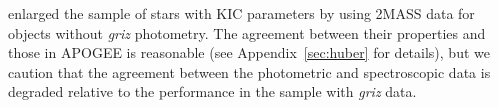 \documentclass[preprint2]{aastex62}
\newcommand{\vsini}{\ensuremath{v \sin i}}
\newcommand{\Kepler}{\mbox{\textit{Kepler}}}
\newcommand{\Gaia}{\mbox{\textit{Gaia}}}
\begin{document}
%

\citet{Huber14} enlarged the sample of stars with KIC parameters by using 2MASS
data for objects without \textit{griz} photometry. The agreement between their
properties and those in APOGEE is reasonable (see Appendix~\ref{sec:huber} for
details), but we caution that the agreement between the photometric and
spectroscopic data is degraded relative to the performance in the sample with
\textit{griz} data.
\end{document}
